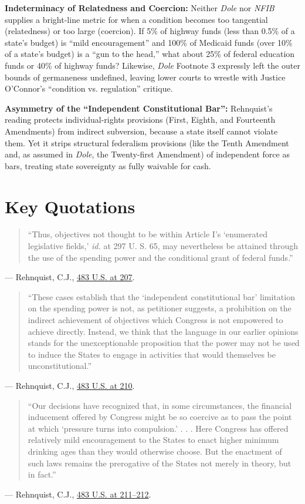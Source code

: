 \documentclass[12pt]{article}
\begin{document}
\textbf{Indeterminacy of Relatedness and Coercion:} Neither \textit{Dole} nor \textit{NFIB} supplies a bright-line metric for when a condition becomes too tangential (relatedness) or too large (coercion). If 5\% of highway funds (less than 0.5\% of a state's budget) is ``mild encouragement'' and 100\% of Medicaid funds (over 10\% of a state's budget) is a ``gun to the head,'' what about 25\% of federal education funds or 40\% of highway funds? Likewise, \textit{Dole} Footnote 3 expressly left the outer bounds of germaneness undefined, leaving lower courts to wrestle with Justice O'Connor's ``condition vs. regulation'' critique.

\textbf{Asymmetry of the ``Independent Constitutional Bar'':} Rehnquist's reading protects individual-rights provisions (First, Eighth, and Fourteenth Amendments) from indirect subversion, because a state itself cannot violate them. Yet it strips structural federalism provisions (like the Tenth Amendment and, as assumed in \textit{Dole}, the Twenty-first Amendment) of independent force as bars, treating state sovereignty as fully waivable for cash.

\section{Key Quotations}
\begin{quote}
``Thus, objectives not thought to be within Article I's `enumerated legislative fields,' \textit{id.} at 297 U. S. 65, may nevertheless be attained through the use of the spending power and the conditional grant of federal funds.''
\end{quote}
\noindent --- Rehnquist, C.J., \href{https://supreme.justia.com/cases/federal/us/483/203/}{483 U.S. at 207}.

\begin{quote}
``These cases establish that the `independent constitutional bar' limitation on the spending power is not, as petitioner suggests, a prohibition on the indirect achievement of objectives which Congress is not empowered to achieve directly. Instead, we think that the language in our earlier opinions stands for the unexceptionable proposition that the power may not be used to induce the States to engage in activities that would themselves be unconstitutional.''
\end{quote}
\noindent --- Rehnquist, C.J., \href{https://supreme.justia.com/cases/federal/us/483/203/}{483 U.S. at 210}.

\begin{quote}
``Our decisions have recognized that, in some circumstances, the financial inducement offered by Congress might be so coercive as to pass the point at which `pressure turns into compulsion.' . . . Here Congress has offered relatively mild encouragement to the States to enact higher minimum drinking ages than they would otherwise choose. But the enactment of such laws remains the prerogative of the States not merely in theory, but in fact.''
\end{quote}
\noindent --- Rehnquist, C.J., \href{https://supreme.justia.com/cases/federal/us/483/203/}{483 U.S. at 211--212}.
\end{document}

